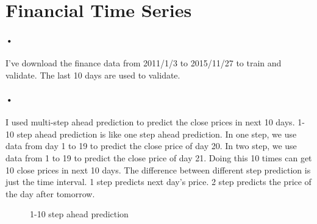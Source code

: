 \documentclass{article}
\begin{document}
\section{Financial Time Series}
\paragraph{•}I've download the finance data from 2011/1/3 to 2015/11/27 to train and validate. The last 10 days are used to validate.
\paragraph{•}I used multi-step ahead prediction to predict the close prices in next 10 days. 1-10 step ahead prediction is like one step ahead prediction. In one step, we use data from day 1 to 19 to predict the close price of day 20. In two step, we use data from 1 to 19 to predict the close price of day 21. Doing this 10 times can get 10 close prices in next 10 days. The difference between different step prediction is just the time interval. 1 step predicts next day's price. 2 step predicts the price of the day after tomorrow. 
\newpage 
\begin{figure}[htbp]
 \centering
 \caption{1-10 step ahead prediction}
\end{figure}
\end{document}
